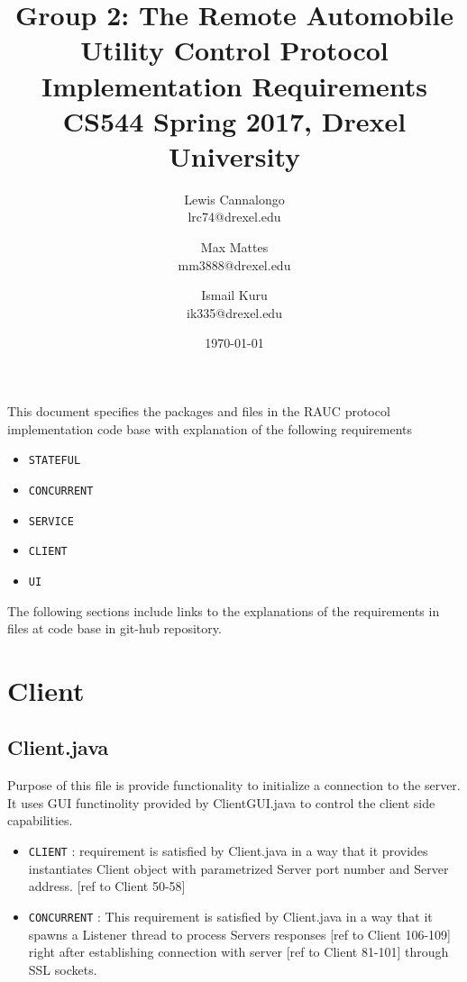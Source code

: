 \documentclass[12pt]{usenixsubmit}
\begin{document}

\title{Group 2: The Remote Automobile Utility Control Protocol Implementation Requirements \\ \Large{CS544 Spring 2017, Drexel University}}

\author{
    Lewis Cannalongo \\
    lrc74@drexel.edu
    \and
     Max Mattes \\
    mm3888@drexel.edu
    \and
    Ismail Kuru \\
    ik335@drexel.edu
}
\date{\today}

\maketitle
This document specifies the packages and files in the RAUC protocol implementation code base with explanation of the following requirements
\begin{itemize}
  \item {\tt STATEFUL}
  \item {\tt CONCURRENT}
  \item {\tt SERVICE}
  \item {\tt CLIENT}
  \item {\tt UI}
  \end{itemize}

The following sections include links to the explanations of the requirements in files at code base in git-hub repository.
\section{Client}
\subsection{Client.java}Purpose of this file is provide functionality to initialize a connection to the server. It uses GUI functinolity provided by ClientGUI.java to control the client side capabilities. 
\begin{itemize}
\item {\tt CLIENT} : requirement is satisfied by Client.java in a way that it provides instantiates Client object with parametrized Server port number and Server address. [ref to Client 50-58]
  \item {\tt CONCURRENT} : This requirement is satisfied by Client.java in a way that it spawns a Listener thread to process Servers responses [ref to Client 106-109] right after establishing connection with server [ref to Client 81-101] through SSL sockets.
\end{itemize}
           
\end{document}
